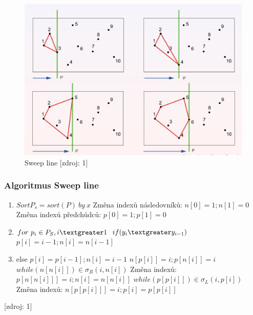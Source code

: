 \documentclass[a4paper, 12pt]{article}
\begin{document}
\begin{figure}[h!]
	\centering
	\includegraphics[width=12cm]{sweep_line.jpg}
	\caption{Sweep line [zdroj: 1]}
\end{figure}

\newpage
\subsubsection{Algoritmus Sweep line}
\begin{enumerate}
\item $ Sort P_s = sort(P) ~by~ x $ 
\subitem Změna indexů následovníků: $ n[0] = 1; n[1] = 0  $
\subitem Změna indexů předchůdců: $ p[0] = 1; p[1] = 0$
\item $ for~ p_i \in P_S, i \textgreater 1$
\subitem $ if (y_i \textgreater y_{i-1})  $
\subsubitem $ p[i] = i-1; n[i] = n[i-1]$
\item else $ p[i] = p[i-1]; n[i] = i-1$
\subitem $ n[p[i]] = i; p[n[i]] = i  $
\subitem $ while (n[n[i]]) \in \sigma_R (i, n[i])  $
\subsubitem Změna indexů: $ p[n[n[i]]] = i; n[i] = n[n[i]]$
\subitem $ while (p[p[i]]) \in \sigma_L (i, p[i])  $
\subsubitem Změna indexů: $ n[p[p[i]]] = i; p[i] = p[p[i]]$
\end{enumerate}
[zdroj: 1]
\newpage
\end{document}
